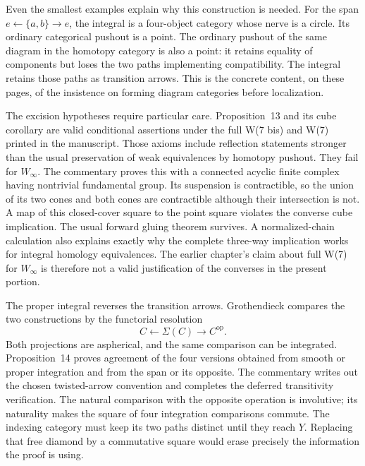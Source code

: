 Even the smallest examples explain why this construction is needed. For the span $e\leftarrow\{a,b\}\to e$, the integral is a four-object category whose nerve is a circle. Its ordinary categorical pushout is a point. The ordinary pushout of the same diagram in the homotopy category is also a point: it retains equality of components but loses the two paths implementing compatibility. The integral retains those paths as transition arrows. This is the concrete content, on these pages, of the insistence on forming diagram categories before localization.

The excision hypotheses require particular care. Proposition~13 and its cube corollary are valid conditional assertions under the full W(7 bis) and W(7) printed in the manuscript. Those axioms include reflection statements stronger than the usual preservation of weak equivalences by homotopy pushout. They fail for $W_\infty$. The commentary proves this with a connected acyclic finite complex having nontrivial fundamental group. Its suspension is contractible, so the union of its two cones and both cones are contractible although their intersection is not. A map of this closed-cover square to the point square violates the converse cube implication. The usual forward gluing theorem survives. A normalized-chain calculation also explains exactly why the complete three-way implication works for integral homology equivalences. The earlier chapter's claim about full W(7) for $W_\infty$ is therefore not a valid justification of the converses in the present portion.

The proper integral reverses the transition arrows. Grothendieck compares the two constructions by the functorial resolution
\[
                         C\longleftarrow\Sigma(C)\longrightarrow C^{\mathrm{op}}.
\]
Both projections are aspherical, and the same comparison can be integrated. Proposition~14 proves agreement of the four versions obtained from smooth or proper integration and from the span or its opposite. The commentary writes out the chosen twisted-arrow convention and completes the deferred transitivity verification. The natural comparison with the opposite operation is involutive; its naturality makes the square of four integration comparisons commute. The indexing category must keep its two paths distinct until they reach $Y$. Replacing that free diamond by a commutative square would erase precisely the information the proof is using.

